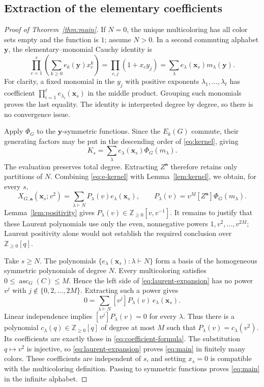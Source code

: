 \documentclass[11pt]{article}
\theoremstyle{remark}
\newcommand{\NN}{\mathbb Z_{\geq 0}}
\newcommand{\xx}{\mathbf x}
\newcommand{\avec}{\mathbf a}
\DeclareMathOperator{\asc}{asc}
\numberwithin{equation}{section}
\begin{document}
\subsection{Extraction of the elementary coefficients}
\begin{proof}[Proof of Theorem~\ref{thm:main}]
If $N=0$, the unique multicoloring has all color sets empty and the
function is $1$; assume $N>0$. In a second commuting alphabet
$\mathbf y$, the elementary--monomial Cauchy identity is
\begin{equation}\label{eq:cauchy}
 \prod_{c=1}^s\left(\sum_{k\geq0}e_k(\mathbf y)x_c^k\right)
   =\prod_{c,j}(1+x_cy_j)
   =\sum_\lambda e_\lambda(\xx_s)m_\lambda(\mathbf y).
\end{equation}
For clarity, a fixed monomial in the $y_j$ with positive exponents
$\lambda_1,\ldots,\lambda_\ell$ has coefficient
$\prod_{i=1}^{\ell}e_{\lambda_i}(\xx_s)$ in the middle product.
Grouping such monomials proves the last equality. The identity is
interpreted degree by degree, so there is no convergence issue.

Apply $\Phi_G$ to the $\mathbf y$-symmetric functions. Since the
$E_k(G)$ commute, their generating factors may be put in the descending
order of \eqref{eq:kernel}, giving
\begin{equation}\label{eq:e-kernel}
 K_s=\sum_\lambda e_\lambda(\xx_s)\Phi_G(m_\lambda).
\end{equation}
The evaluation preserves total degree. Extracting $Z^{\avec}$ therefore
retains only partitions of $N$. Combining \eqref{eq:e-kernel} with
Lemma~\ref{lem:kernel}, we obtain, for every $s$,
\begin{equation}\label{eq:laurent-expansion}
 X_{G,\avec}(\xx_s;v^2)
   =\sum_{\lambda\vdash N}P_\lambda(v)e_\lambda(\xx_s),
 \qquad
 P_\lambda(v)=v^M[Z^{\avec}]\Phi_G(m_\lambda).
\end{equation}
Lemma~\ref{lem:positivity} gives
$P_\lambda(v)\in\NN[v,v^{-1}]$.
It remains to justify that these Laurent polynomials use only the even,
nonnegative powers $1,v^2,\ldots,v^{2M}$; Laurent positivity alone
would not establish the required conclusion over $\NN[q]$.

Take $s\geq N$. The polynomials
$\{e_\lambda(\xx_s):\lambda\vdash N\}$ form a basis of the homogeneous
symmetric polynomials of degree $N$. Every multicoloring satisfies
$0\leq\asc_G(C)\leq M$. Hence the left side of
\eqref{eq:laurent-expansion} has no power $v^j$ with
$j\notin\{0,2,\ldots,2M\}$. Extracting such a power gives
\[
 0=\sum_{\lambda\vdash N}
           [v^j]P_\lambda(v)\,e_\lambda(\xx_s).
\]
Linear independence implies $[v^j]P_\lambda(v)=0$ for every
$\lambda$. Thus there is a polynomial $c_\lambda(q)\in\NN[q]$
of degree at most $M$ such that $P_\lambda(v)=c_\lambda(v^2)$.
Its coefficients are exactly those in
\eqref{eq:coefficient-formula}. The substitution $q\mapsto v^2$
is injective, so \eqref{eq:laurent-expansion} proves
\eqref{eq:main} in finitely many colors. These coefficients are
independent of $s$, and setting $x_s=0$ is compatible with the
multicoloring definition. Passing to symmetric functions proves
\eqref{eq:main} in the infinite alphabet.
\end{proof}
\end{document}
